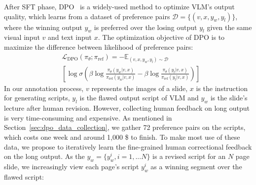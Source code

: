 After SFT phase, DPO~\cite{rafailov2024direct} is a widely-used method to optimize VLM's output quality, which learns from a dataset of preference pairs $\mathcal{D}=\{(v,x, y_w, y_l)\}$, where the winning output $y_w$ is preferred over the losing output $y_l$ given the same visual input $v$ and text input $x$. The optimization objective of DPO is to maximize the difference between likelihood of preference pairs:  
\begin{equation}
\begin{aligned}
&\mathcal{L}_\text{DPO}(\pi_\theta; \pi_\text{ref})= -\mathbb{E}_{(v,x, y_w, y_l)\sim\mathcal{D}} \\
&[\log\sigma(\beta\log\frac{\pi_\theta(y_w|v,x)}{\pi_\text{ref}(y_w|v,x)}-\beta\log\frac{\pi_\theta(y_l|v,x)}{\pi_\text{ref}(y_l|v,x)})]
\end{aligned}
\end{equation}
In our annotation process, $v$ represents the images of a slide, $x$ is the instruction for generating scripts, $y_l$ is the flawed output script of VLM and $y_w$ is the slide's lecture after human revision. However, collecting human feedback on long output is very time-consuming and expensive. As mentioned in Section~\ref{sec:dpo_data_collection}, we gather 72 preference pairs on the scripts, which costs one week and around 1,000 \$ to finish.  To make most use of these data, we propose to iteratively learn the fine-grained human correctional feedback on the long output. As the $y_w = \{y_w^{i}, i=1,...N\}$ is a revised script for an $N$ page slide, we increasingly view each page's script $y_w^{i}$ as a winning segment over the flawed script:

